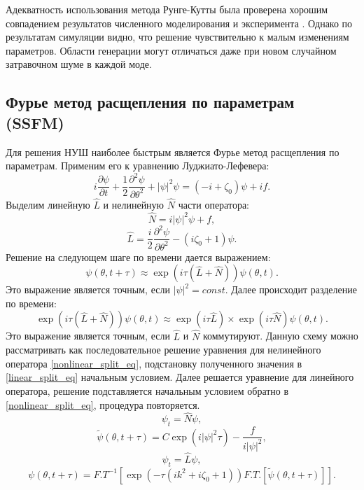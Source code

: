 Адекватность использования метода Рунге-Кутты была проверена хорошим совпадением результатов численного моделирования и эксперимента \cite{mlg_to_nature}. Однако по результатам симуляции видно, что решение чувствительно к малым изменениям параметров. Области генерации могут отличаться даже при новом случайном затравочном шуме в каждой моде.

\subsection{Фурье метод расщепления по параметрам (SSFM)}
Для решения НУШ наиболее быстрым является Фурье метод расщепления по параметрам. Применим его к уравнению Луджиато-Лефевера:
\begin{equation}
i\frac{\partial \psi}{\partial t}+\frac{1}{2}\frac{\partial^2 \psi}{\partial \theta^2}+|\psi|^2\psi=(-i+\zeta_0)\psi+if.
\end{equation}
Выделим линейную $\hat{L}$ и нелинейную $\hat{N}$ части оператора:
\begin{equation}
\hat{N}=i|\psi|^2\psi+f,
\end{equation}
\begin{equation}
\hat{L}=\frac{i}{2}\frac{\partial^2\psi}{\partial \theta^2}-(i\zeta_0+1)\psi.
\end{equation}
Решение на следующем шаге по времени дается выражением:
\begin{equation}
\psi(\theta,t+\tau)\approx\exp (i\tau(\hat{L}+\hat{N}))\psi(\theta,t).
\end{equation}
Это выражение является точным, если $|\psi|^2=const$. Далее происходит разделение по времени:
\begin{equation}
\exp (i\tau(\hat{L}+\hat{N}))\psi(\theta,t)
\approx\exp(i\tau\hat{L})\times\exp(i\tau\hat{N})\psi(\theta,t).
\end{equation}
Это выражение является точным, если $\hat{L}$ и $\hat{N}$ коммутируют. Данную схему можно рассматривать как последовательное решение уравнения для нелинейного оператора \eqref{nonlinear_split_eq}, подстановку полученного значения в \eqref{linear_split_eq} начальным условием. Далее решается уравнение для линейного оператора, решение подставляется начальным условием обратно в \eqref{nonlinear_split_eq}, процедура повторяется.
\begin{equation}\label{nonlinear_split_eq}
\psi_t=\hat{N}\psi,
\end{equation}
\begin{equation}
\tilde{\psi}(\theta,t+\tau)=C\exp(i|\psi|^2\tau)-\frac{f}{i|\psi|^2},
\end{equation}
\begin{equation}\label{linear_split_eq}
\psi_t=\hat{L}\psi,
\end{equation}
\begin{equation}
\psi(\theta,t+\tau)=F.T^{-1}[\exp(-\tau(ik^2+i\zeta_0+1))F.T.[\tilde{\psi}(\theta,t+\tau)]].
\end{equation}

